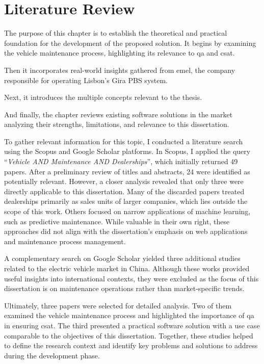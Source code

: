 \chapter{Literature Review}%
\label{chapter:literatureReview}

\begin{introduction}
The purpose of this chapter is to establish the theoretical and practical foundation for the development of the proposed solution. It begins by examining the vehicle maintenance process, highlighting its relevance to \ac{qa} and \ac{csat}. 

Then it incorporates real-world insights gathered from \ac{emel}, the company responsible for operating Lisbon's Gira \acs{PBS} system. 

Next, it introduces the multiple concepts relevant to the thesis.

And finally, the chapter reviews existing software solutions in the market analyzing their strengths, limitations, and relevance to this dissertation.
\end{introduction} 

To gather relevant information for this topic, I conducted a literature search using the Scopus and Google Scholar platforms. In Scopus, I applied the query “\textit{Vehicle AND Maintenance AND Dealerships}”, which initially returned 49 papers. After a preliminary review of titles and abstracts, 24 were identified as potentially relevant. However, a closer analysis revealed that only three were directly applicable to this dissertation. Many of the discarded papers treated dealerships primarily as sales units of larger companies, which lies outside the scope of this work. Others focused on narrow applications of machine learning, such as predictive maintenance. While valuable in their own right, these approaches did not align with the dissertation's emphasis on web applications and maintenance process management.

A complementary search on Google Scholar yielded three additional studies related to the electric vehicle market in China. Although these works provided useful insights into international contexts, they were excluded as the focus of this dissertation is on maintenance operations rather than market-specific trends.

Ultimately, three papers were selected for detailed analysis. Two of them examined the vehicle maintenance process and highlighted the importance of \ac{qa} in ensuring \ac{csat}. The third presented a practical software solution with a use case comparable to the objectives of this dissertation. Together, these studies helped to define the research context and identify key problems and solutions to address during the development phase.

